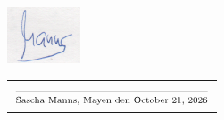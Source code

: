 \documentclass[a4paper]{friggeri-cv} %
\begin{document}





\begin{center}
\includegraphics[scale=0.7]{../Pictures/signatur1.png} \\
\begin{tabular}{@{}l@{}}
\\ $\frac{}{\strut\textnormal{Sascha Manns, Mayen den \today}}$
\end{tabular}
\end{center}

\end{document}
